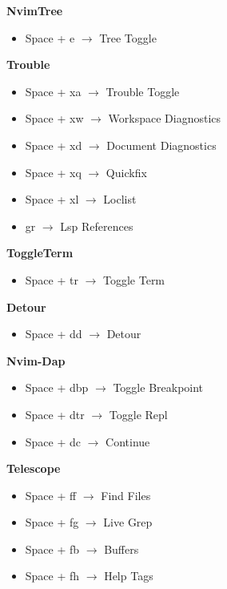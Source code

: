 \documentclass[12pt, a4paper]{article}
\begin{document}
\textbf{NvimTree}
\begin{itemize}
    \item Space + e  $\rightarrow$ Tree Toggle
\end{itemize}

\textbf{Trouble}
\begin{itemize}
    \item Space + xa $\rightarrow$ Trouble Toggle
    \item Space + xw $\rightarrow$ Workspace Diagnostics 
    \item Space + xd $\rightarrow$ Document Diagnostics 
    \item Space + xq $\rightarrow$ Quickfix 
    \item Space + xl $\rightarrow$ Loclist 
    \item gr $\rightarrow$ Lsp References 
\end{itemize}

\textbf{ToggleTerm}
\begin{itemize}
    \item Space + tr  $\rightarrow$ Toggle Term
\end{itemize}

\textbf{Detour}
\begin{itemize}
    \item Space + dd  $\rightarrow$ Detour 
\end{itemize}

\textbf{Nvim-Dap}
\begin{itemize}
    \item Space + dbp  $\rightarrow$ Toggle Breakpoint 
    \item Space + dtr  $\rightarrow$ Toggle Repl 
    \item Space + dc  $\rightarrow$ Continue 
\end{itemize}

\textbf{Telescope}
\begin{itemize}
    \item Space + ff $\rightarrow$ Find Files 
    \item Space + fg $\rightarrow$ Live Grep 
    \item Space + fb $\rightarrow$ Buffers 
    \item Space + fh $\rightarrow$ Help Tags 
\end{itemize}
\end{document}
